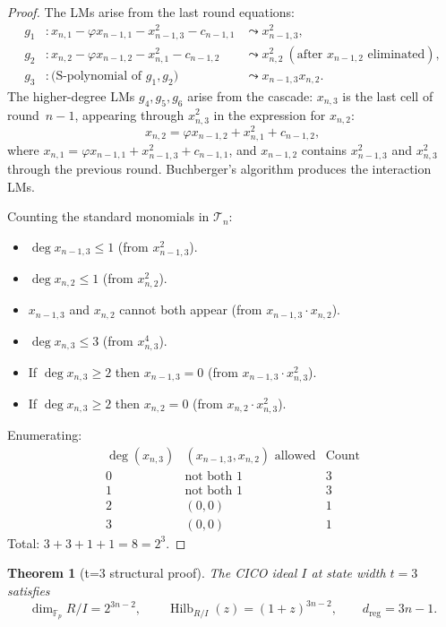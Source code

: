 \documentclass[a4paper,11pt]{article}
\newtheorem{theorem}{Theorem}
\newcommand{\Fp}{\mathbb{F}_p}
\begin{document}
\begin{proof}
The LMs arise from the last round equations:
\begin{align*}
g_1 &: x_{n,1} - \varphi x_{n-1,1} - x_{n-1,3}^2 - c_{n-1,1}
        &\leadsto x_{n-1,3}^2,\\
g_2 &: x_{n,2} - \varphi x_{n-1,2} - x_{n,1}^2 - c_{n-1,2}
        &\leadsto x_{n,2}^2\ (\text{after }x_{n-1,2}\text{ eliminated}),\\
g_3 &: \text{(S-polynomial of }g_1,g_2) &\leadsto x_{n-1,3}x_{n,2}.
\end{align*}
The higher-degree LMs $g_4,g_5,g_6$ arise from the cascade:
$x_{n,3}$ is the last cell of round~$n-1$, appearing through
$x_{n,3}^2$ in the expression for $x_{n,2}$:
\[
x_{n,2} = \varphi x_{n-1,2} + x_{n,1}^2 + c_{n-1,2},
\]
where $x_{n,1} = \varphi x_{n-1,1} + x_{n-1,3}^2 + c_{n-1,1}$, and
$x_{n-1,2}$ contains $x_{n-1,3}^2$ and $x_{n,3}^2$ through the
previous round. Buchberger's algorithm produces the interaction LMs.

Counting the standard monomials in $\mathcal{T}_n$:
\begin{itemize}
  \item $\deg x_{n-1,3} \le 1$ (from $x_{n-1,3}^2$).
  \item $\deg x_{n,2} \le 1$ (from $x_{n,2}^2$).
  \item $x_{n-1,3}$ and $x_{n,2}$ cannot both appear (from
        $x_{n-1,3}\cdot x_{n,2}$).
  \item $\deg x_{n,3} \le 3$ (from $x_{n,3}^4$).
  \item If $\deg x_{n,3} \ge 2$ then $x_{n-1,3} = 0$ (from
        $x_{n-1,3}\cdot x_{n,3}^2$).
  \item If $\deg x_{n,3} \ge 2$ then $x_{n,2} = 0$ (from
        $x_{n,2}\cdot x_{n,3}^2$).
\end{itemize}
Enumerating:
\[
\begin{array}{c|c|c}
\deg(x_{n,3}) & (x_{n-1,3}, x_{n,2})\text{ allowed} & \text{Count} \\
\hline
0 & \text{not both 1} & 3\\
1 & \text{not both 1} & 3\\
2 & (0,0) & 1\\
3 & (0,0) & 1
\end{array}
\]
Total: $3+3+1+1 = 8 = 2^3$.
\end{proof}

\begin{theorem}[t=3 structural proof]\label{thm:t3}
The CICO ideal $I$ at state width $t=3$ satisfies
\[
\dim_{\Fp} R/I = 2^{3n-2},\qquad
\operatorname{Hilb}_{R/I}(z) = (1+z)^{3n-2},\qquad
d_{\mathrm{reg}} = 3n-1.
\]
\end{theorem}
\end{document}
